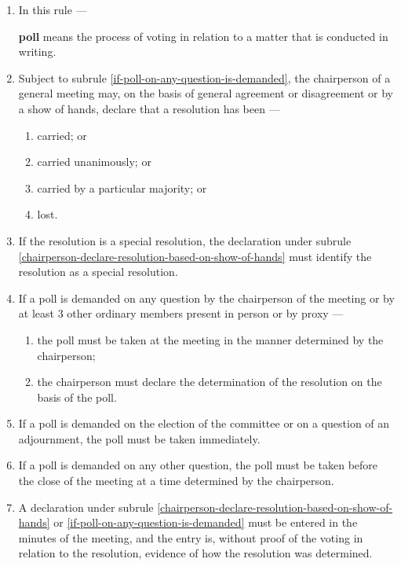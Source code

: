 \documentclass[../constitution.tex]{subfiles}
\begin{document}
\begin{enumerate}

\item In this rule ---
  
  \textbf{poll} means the process of voting in relation to a matter that is conducted in writing.

\item Subject to subrule \ref{if-poll-on-any-question-is-demanded}, the chairperson of a general meeting may, on the basis of general agreement or disagreement or by a show of hands, declare that a resolution has been --- \label{chairperson-declare-resolution-based-on-show-of-hands}

  \begin{enumerate}
  
  \item carried; or
  \item carried unanimously; or
  \item carried by a particular majority; or
  \item lost.
  \end{enumerate}
\item If the resolution is a special resolution, the declaration under subrule \ref{chairperson-declare-resolution-based-on-show-of-hands} must identify the resolution as a special resolution.
\item If a poll is demanded on any question by the chairperson of the meeting or by at least 3 other ordinary members present in person or by proxy --- \label{if-poll-on-any-question-is-demanded}

  \begin{enumerate}
  
  \item the poll must be taken at the meeting in the manner determined by the chairperson;
  \item the chairperson must declare the determination of the resolution on the basis of the poll.
  \end{enumerate}
\item If a poll is demanded on the election of the committee or on a question of an adjournment, the poll must be taken immediately.
\item If a poll is demanded on any other question, the poll must be taken before the close of the meeting at a time determined by the chairperson.
\item A declaration under subrule \ref{chairperson-declare-resolution-based-on-show-of-hands} or \ref{if-poll-on-any-question-is-demanded} must be entered in the minutes of the meeting, and the entry is, without proof of the voting in relation to the resolution, evidence of how the resolution was determined.
\end{enumerate}
\end{document}
